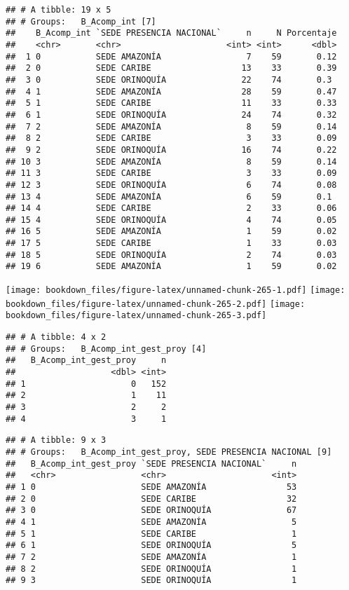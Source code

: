 \documentclass[]{article}
\theoremstyle{definition}
\theoremstyle{definition}
\theoremstyle{definition}
\theoremstyle{remark}
\begin{document}
\begin{verbatim}
## # A tibble: 19 x 5
## # Groups:   B_Acomp_int [7]
##    B_Acomp_int `SEDE PRESENCIA NACIONAL`     n     N Porcentaje
##    <chr>       <chr>                     <int> <int>      <dbl>
##  1 0           SEDE AMAZONÍA                 7    59       0.12
##  2 0           SEDE CARIBE                  13    33       0.39
##  3 0           SEDE ORINOQUÍA               22    74       0.3 
##  4 1           SEDE AMAZONÍA                28    59       0.47
##  5 1           SEDE CARIBE                  11    33       0.33
##  6 1           SEDE ORINOQUÍA               24    74       0.32
##  7 2           SEDE AMAZONÍA                 8    59       0.14
##  8 2           SEDE CARIBE                   3    33       0.09
##  9 2           SEDE ORINOQUÍA               16    74       0.22
## 10 3           SEDE AMAZONÍA                 8    59       0.14
## 11 3           SEDE CARIBE                   3    33       0.09
## 12 3           SEDE ORINOQUÍA                6    74       0.08
## 13 4           SEDE AMAZONÍA                 6    59       0.1 
## 14 4           SEDE CARIBE                   2    33       0.06
## 15 4           SEDE ORINOQUÍA                4    74       0.05
## 16 5           SEDE AMAZONÍA                 1    59       0.02
## 17 5           SEDE CARIBE                   1    33       0.03
## 18 5           SEDE ORINOQUÍA                2    74       0.03
## 19 6           SEDE AMAZONÍA                 1    59       0.02
\end{verbatim}

\texttt{[image: bookdown\_files/figure-latex/unnamed-chunk-265-1.pdf]}
\texttt{[image: bookdown\_files/figure-latex/unnamed-chunk-265-2.pdf]}
\texttt{[image: bookdown\_files/figure-latex/unnamed-chunk-265-3.pdf]}

\begin{verbatim}
## # A tibble: 4 x 2
## # Groups:   B_Acomp_int_gest_proy [4]
##   B_Acomp_int_gest_proy     n
##                   <dbl> <int>
## 1                     0   152
## 2                     1    11
## 3                     2     2
## 4                     3     1
\end{verbatim}

\begin{verbatim}
## # A tibble: 9 x 3
## # Groups:   B_Acomp_int_gest_proy, SEDE PRESENCIA NACIONAL [9]
##   B_Acomp_int_gest_proy `SEDE PRESENCIA NACIONAL`     n
##   <chr>                 <chr>                     <int>
## 1 0                     SEDE AMAZONÍA                53
## 2 0                     SEDE CARIBE                  32
## 3 0                     SEDE ORINOQUÍA               67
## 4 1                     SEDE AMAZONÍA                 5
## 5 1                     SEDE CARIBE                   1
## 6 1                     SEDE ORINOQUÍA                5
## 7 2                     SEDE AMAZONÍA                 1
## 8 2                     SEDE ORINOQUÍA                1
## 9 3                     SEDE ORINOQUÍA                1
\end{verbatim}
\end{document}
